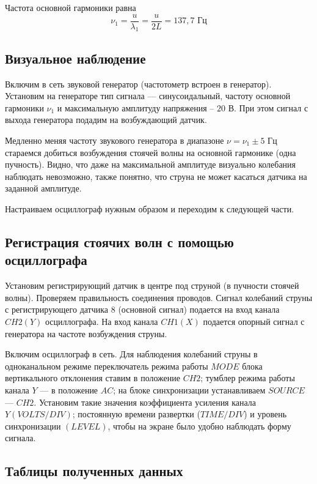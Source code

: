 \documentclass[a4paper, 12pt]{article} %
\begin{document}
Частота основной гармоники равна 
\[\nu_1 = \frac{u}{\lambda_1} = \frac{u}{2L} = 137,7 \text{ Гц}\]

\subsection{Визуальное наблюдение}

Включим в сеть звуковой генератор (частотометр встроен в генератор). Установим на генераторе тип сигнала — синусоидальный, частоту основной гармоники $\nu_1$ и
максимальную амплитуду напряжения -- $20$ В. При этом сигнал с выхода генератора подадим на возбуждающий датчик.

Медленно меняя частоту звукового генератора в диапазоне $\nu = \nu_1 \pm 5 \text{ Гц}$ стараемся добиться возбуждения стоячей волны на основной гармонике (одна пучность). Видно, что даже на максимальной амплитуде визуально колебания наблюдать невозможно, также понятно, что струна не может касаться датчика на заданной амплитуде.

Настраиваем осциллограф нужным образом и переходим к следующей части.\\

\subsection{Регистрация стоячих волн с помощью осциллографа}

Установим регистрирующий датчик в центре под струной (в пучности стоячей волны). Проверяем правильность соединения проводов. Сигнал колебаний струны с регистрирующего датчика $8$ (основной сигнал) подается на вход канала $CH2(Y)$ осциллографа. На вход канала $CH1(X)$ подается опорный сигнал с генератора на
частоте возбуждения струны.

Включим осциллограф в сеть. Для наблюдения колебаний струны в одноканальном режиме переключатель режима работы $MODE$ блока вертикального отклонения ставим в положение $CH2$; тумблер режима работы канала $Y$ — в положение $AC$;
на блоке синхронизации устанавливаем $SOURCE$ — $CH2$. Установим такие значения коэффициента усиления канала $Y (VOLTS/DIV)$; постоянную времени
развертки ($TIME/DIV$) и уровень синхронизации $(LEVEL)$, чтобы на экране
было удобно наблюдать форму сигнала.

\subsection{Таблицы полученных данных}
\end{document}
